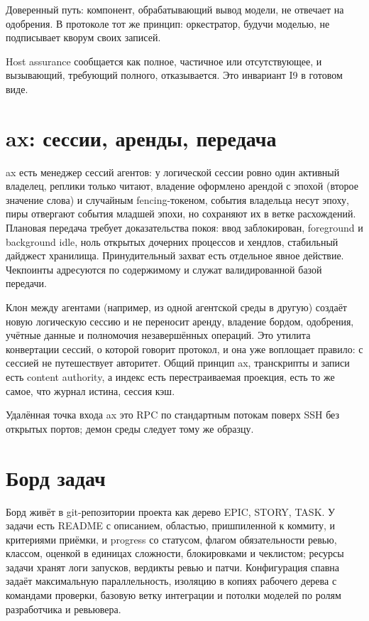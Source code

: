 Доверенный путь: компонент, обрабатывающий вывод модели, не отвечает на одобрения. В протоколе тот же принцип: оркестратор, будучи моделью, не подписывает кворум своих записей.

Host assurance сообщается как полное, частичное или отсутствующее, и вызывающий, требующий полного, отказывается. Это инвариант I9 в готовом виде.

\section{ax: сессии, аренды, передача}

ax есть менеджер сессий агентов: у логической сессии ровно один активный владелец, реплики только читают, владение оформлено арендой с эпохой (второе значение слова) и случайным fencing-токеном, события владельца несут эпоху, пиры отвергают события младшей эпохи, но сохраняют их в ветке расхождений. Плановая передача требует доказательства покоя: ввод заблокирован, foreground и background idle, ноль открытых дочерних процессов и хендлов, стабильный дайджест хранилища. Принудительный захват есть отдельное явное действие. Чекпоинты адресуются по содержимому и служат валидированной базой передачи.

Клон между агентами (например, из одной агентской среды в другую) создаёт новую логическую сессию и не переносит аренду, владение бордом, одобрения, учётные данные и полномочия незавершённых операций. Это утилита конвертации сессий, о которой говорит протокол, и она уже воплощает правило: с сессией не путешествует авторитет. Общий принцип ax, транскрипты и записи есть content authority, а индекс есть перестраиваемая проекция, есть то же самое, что журнал истина, сессия кэш.

Удалённая точка входа ax это RPC по стандартным потокам поверх SSH без открытых портов; демон среды следует тому же образцу.

\section{Борд задач}

Борд живёт в git-репозитории проекта как дерево EPIC, STORY, TASK. У задачи есть README с описанием, областью, пришпиленной к коммиту, и критериями приёмки, и progress со статусом, флагом обязательности ревью, классом, оценкой в единицах сложности, блокировками и чеклистом; ресурсы задачи хранят логи запусков, вердикты ревью и патчи. Конфигурация спавна задаёт максимальную параллельность, изоляцию в копиях рабочего дерева с командами проверки, базовую ветку интеграции и потолки моделей по ролям разработчика и ревьювера.

